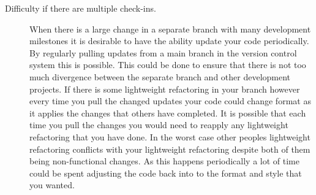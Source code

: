 \begin{description}
% 
% 
% 
% 
% 
% 
% 
% 
\item [Difficulty if there are multiple check-ins.] 
When there is a large change in a separate branch with many development milestones it is desirable to have the ability update your code periodically.  
By regularly pulling updates from a main branch in the version control system this is possible.
This could be done to ensure that there is not too much divergence between the separate branch and other development projects.
If there is some lightweight refactoring in your branch however every time you pull the changed updates your code could change format as it applies the changes that others have completed.
It is possible that each time you pull the changes you would need to reapply any lightweight refactoring that you have done.
In the worst case other peoples lightweight refactoring conflicts with your lightweight refactoring despite both of them being non-functional changes.
As this happens periodically a  lot of time could be spent adjusting the code back into to the format and style that you wanted. 


\end{description}
